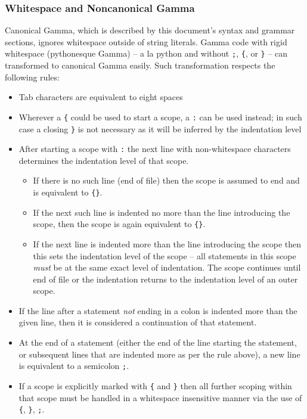\subsubsection{Whitespace and Noncanonical Gamma}
Canonical Gamma, which is described by this document's syntax and grammar sections, ignores whitespace outside of string literals. Gamma code with rigid whitespace (pythonesque Gamma) -- a la python and without \verb!;!, \verb!{!, or \verb!}! -- can transformed to canonical Gamma easily. Such transformation respects the following rules:
\begin{itemize}
\item Tab characters are equivalent to eight spaces
\item Wherever a \verb!{! could be used to start a scope, a \verb!:! can be used instead; in such case a closing \verb!}! is not necessary as it will be inferred by the indentation level
\item After starting a scope with \verb!:! the next line with non-whitespace characters determines the indentation level of that scope.
\begin{itemize}
\item If there is no such line (end of file) then the scope is assumed to end and is equivalent to \verb!{}!.
\item If the next such line is indented no more than the line introducing the scope, then the scope is again equivalent to \verb!{}!.
\item If the next line is indented more than the line introducing the scope then this sets the indentation level of the scope -- all statements in this scope \emph{must} be at the same exact level of indentation. The scope continues until end of file or the indentation returns to the indentation level of an outer scope.
\end{itemize}
\item If the line after a statement \emph{not} ending in a colon is indented more than the given line, then it is considered a continuation of that statement.
\item At the end of a statement (either the end of the line starting the statement, or subsequent lines that are indented more as per the rule above), a new line is equivalent to a semicolon \verb!;!.
\item If a scope is explicitly marked with \verb!{! and \verb!}! then all further scoping within that scope must be handled in a whitespace insensitive manner via the use of \verb!{!, \verb!}!, \verb!;!. 
\end{itemize}